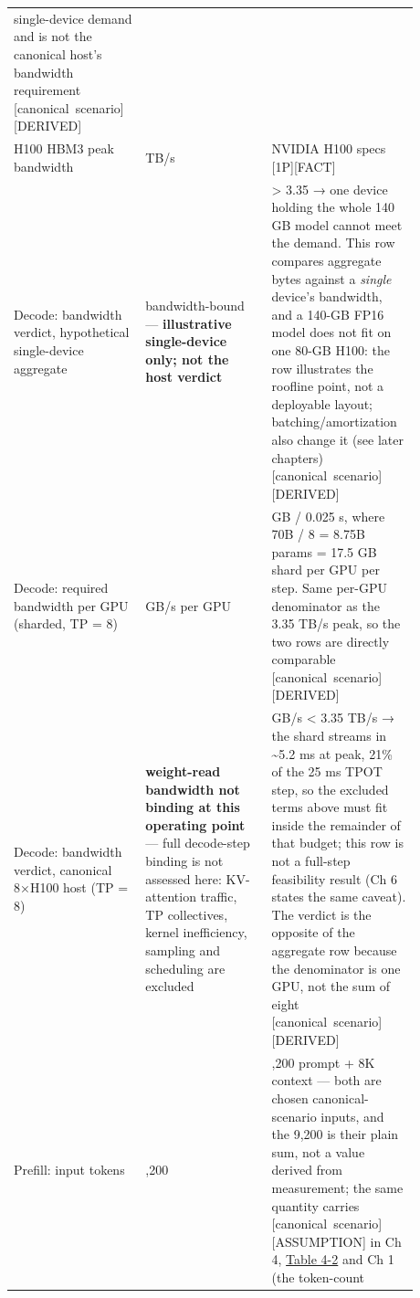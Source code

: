 \begin{longtable}[]{@{}
  >{\raggedright\arraybackslash}p{0.2927\linewidth}
  >{\raggedright\arraybackslash}p{0.2927\linewidth}
  >{\raggedright\arraybackslash}p{0.2927\linewidth}@{}}
single-device demand and is not the canonical host's bandwidth
requirement \mbox{{[}canonical scenario{]}}\hspace{0pt}\mbox{{[}DERIVED{]}} \\
H100 HBM3 peak bandwidth & 3.35 TB/s & NVIDIA H100 specs
\mbox{{[}1P{]}}\hspace{0pt}\mbox{{[}FACT{]}} \\
Decode: bandwidth verdict, hypothetical single-device aggregate &
bandwidth-bound --- \textbf{illustrative single-device only; not the
host verdict} & 5.6 \textgreater{} 3.35 → one device holding the whole
140 GB model cannot meet the demand. This row compares aggregate bytes
against a \emph{single} device's bandwidth, and a 140-GB FP16 model does
not fit on one 80-GB H100: the row illustrates the roofline point, not a
deployable layout; batching/amortization also change it (see later
chapters) \mbox{{[}canonical scenario{]}}\hspace{0pt}\mbox{{[}DERIVED{]}} \\
Decode: required bandwidth per GPU (sharded, TP = 8) & 700 GB/s per GPU
& 17.5 GB / 0.025 s, where 70B / 8 = 8.75B params = 17.5 GB shard per
GPU per step. Same per-GPU denominator as the 3.35 TB/s peak, so the two
rows are directly comparable \mbox{{[}canonical scenario{]}}\hspace{0pt}\mbox{{[}DERIVED{]}} \\
Decode: bandwidth verdict, canonical 8×H100 host (TP = 8) &
\textbf{weight-read bandwidth not binding at this operating point} ---
full decode-step binding is not assessed here: KV-attention traffic, TP
collectives, kernel inefficiency, sampling and scheduling are excluded &
700 GB/s \textless{} 3.35 TB/s → the shard streams in \textasciitilde5.2
ms at peak, 21\% of the 25 ms TPOT step, so the excluded terms above
must fit inside the remainder of that budget; this row is not a
full-step feasibility result (Ch 6 states the same caveat). The verdict
is the opposite of the aggregate row because the denominator is one GPU,
not the sum of eight \mbox{{[}canonical scenario{]}}\hspace{0pt}\mbox{{[}DERIVED{]}} \\
Prefill: input tokens & 9,200 & 1,200 prompt + 8K context --- both are
chosen canonical-scenario inputs, and the 9,200 is their plain sum, not
a value derived from measurement; the same quantity carries \mbox{{[}canonical
scenario{]}}\hspace{0pt}\mbox{{[}ASSUMPTION{]}} in Ch 4, \hyperref[tab:4.2]{Table 4-2} and Ch 1 (the token-count

\end{longtable}
